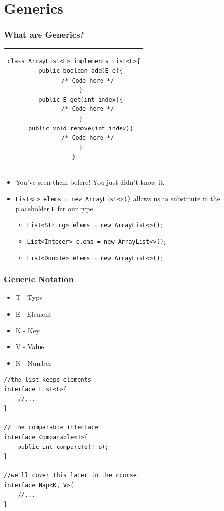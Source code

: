 \documentclass{beamer}
\begin{document}
\section{Generics}
\begin{frame}[fragile]
    \frametitle{What are Generics?}
    \begin{center}
        \begin{tabular}{c}
            \begin{lstlisting}[basicstyle=\scriptsize]
class ArrayList<E> implements List<E>{
    public boolean add(E e){
        /* Code here */
    }
    public E get(int index){
        /* Code here */
    }
    public void remove(int index){
        /* Code here */
    }
}
            \end{lstlisting}
        \end{tabular}
    \end{center}
    \begin{itemize}
        \item You've seen them before! You just didn't know it.
            
        \item \lstinline|List<E> elems = new ArrayList<>()| allows us to substitute in the placeholder \lstinline|E| for our type.
        \begin{itemize}
            \item \lstinline|List<String> elems = new ArrayList<>();|
            \item \lstinline|List<Integer> elems = new ArrayList<>();|
            \item \lstinline|List<Double> elems = new ArrayList<>();|
        \end{itemize}
    \end{itemize}
\end{frame}

\begin{frame}[fragile]
    \frametitle{Generic Notation}
    \begin{minipage}{0.29\textwidth}
        \begin{itemize}
            \item T - Type
            \item E - Element
            \item K - Key
            \item V - Value
            \item N - Number
        \end{itemize}
    \end{minipage}
    \hfill
    \begin{minipage}{0.69\textwidth}
        \begin{lstlisting}[basicstyle=\scriptsize]
//the list keeps elements
interface List<E>{
    //...
}

// the comparable interface 
interface Comparable<T>{
    public int compareTo(T o);
}

//we'll cover this later in the course
interface Map<K, V>{
    //...
}
        \end{lstlisting}
    \end{minipage}
\end{frame}
\end{document}
